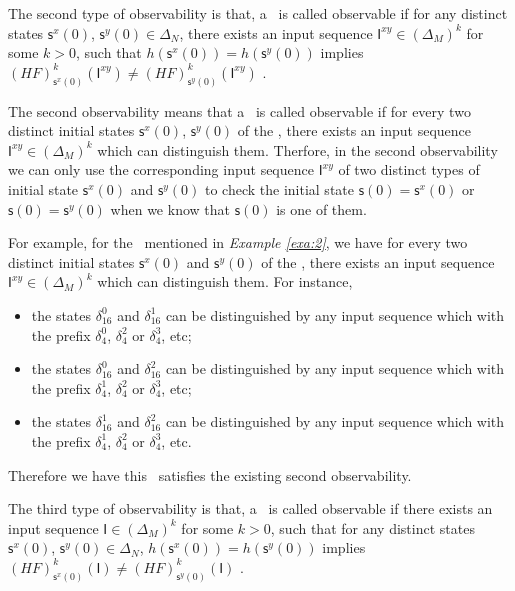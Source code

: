 \begin{definition}
	The second type of observability is that, a \BCN\ is called observable if for any distinct states $\mathsf{s}^{x}(0)$, $\mathsf{s}^{y}(0) \in \Delta_N$, there exists an input sequence $\mathsf{I}^{xy}\in(\Delta_M)^k$ for some $k>0$, such that $h(\mathsf{s}^{x}(0))=h(\mathsf{s}^{y}(0))$ implies $(HF)^k_{\mathsf{s}^{x}(0)}(\mathsf{I}^{xy})\neq (HF)^k_{\mathsf{s}^{y}(0)}(\mathsf{I}^{xy})$ \cite{Zhao2010Input}.
\end{definition}

The second observability means that a \BCN\ is called observable if for every two distinct initial states $\mathsf{s}^{x}(0)$, $\mathsf{s}^{y}(0)$ of the \BCN, there exists an input sequence $\mathsf{I}^{xy} \in(\Delta_M)^k$ which can distinguish them. Therfore, in the second observability we can only use the corresponding input sequence $\mathsf{I}^{xy}$ of two distinct types of initial state $\mathsf{s}^{x}(0)$ and $\mathsf{s}^{y}(0)$ to check the initial state $\mathsf{s}(0)=\mathsf{s}^{x}(0)$ or $\mathsf{s}(0)=\mathsf{s}^{y}(0)$ when we know that $\mathsf{s}(0)$ is one of them. 
\begin{example}
For example, for the \BCN\ mentioned in {\em Example \ref{exa:2}}, we have for every two distinct initial states $\mathsf{s}^{x}(0)$ and $\mathsf{s}^{y}(0)$ of the \BCN, there exists an input sequence $\mathsf{I}^{xy}\in(\Delta_M)^k$ which can distinguish them.  For instance,
\begin{itemize}
  \item the states $\delta_{16}^0$ and $\delta_{16}^1$ can be distinguished by any input sequence which with the prefix $\delta_{4}^0$, $\delta_{4}^2 $ or $\delta_{4}^3$, etc;
  \item the states $\delta_{16}^0$ and $\delta_{16}^2$  can be distinguished by any input sequence which with the prefix $\delta_{4}^1$, $\delta_{4}^2$ or $\delta_{4}^3$, etc;
  \item the states $\delta_{16}^1$ and $\delta_{16}^2$  can be distinguished by any input sequence which with the prefix $\delta_{4}^1$, $\delta_{4}^2$ or $\delta_{4}^3$, etc.
\end{itemize} 

Therefore we have this \BCN\ satisfies the existing second observability.
\label{exa:5}
\end{example}   
\begin{definition}
The third type of observability is that, a \BCN\ is called observable if there exists an input sequence $\mathsf{I}\in(\Delta_M)^k$ for some $k>0$, such that for any distinct states $\mathsf{s}^{x}(0)$, $\mathsf{s}^{y}(0) \in \Delta_N$, $h(\mathsf{s}^{x}(0))=h(\mathsf{s}^{y}(0))$ implies $(HF)^k_{\mathsf{s}^{x}(0)}(\mathsf{I})\neq (HF)^k_{\mathsf{s}^{y}(0)}(\mathsf{I})$ \cite{Cheng2011Identification}.
\end{definition}

